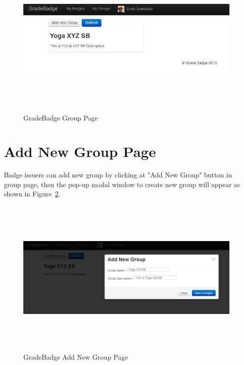 \vspace{3em}
\begin{figure}[H]
\begin{center}
\includegraphics[height=3.1in,width=6.5in]{images/group-page1.png}
\caption{GradeBadge Group Page}
\label{fig:group-page1}
\end{center}
\end{figure}

\newpage
\section{Add New Group Page}
Badge issuers can add new group by clicking at "Add New Group" button in group page, then the pop-up modal window to create new group will appear  as shown in Figure~\ref{fig:add-new-group}. 

\vspace{3em}
\begin{figure}[H]
\begin{center}
\includegraphics[height=3.1in,width=6.5in]{images/add-new-group.png}
\caption{GradeBadge Add New Group Page}
\label{fig:add-new-group}
\end{center}
\end{figure}

